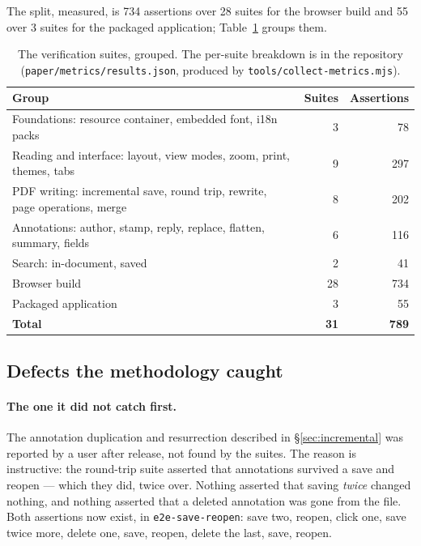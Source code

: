 The split, measured, is 734 assertions over 28 suites for the browser build and 55 over 3
suites for the packaged application; Table~\ref{tab:suites} groups them.

\begin{table}[t]
  \centering
  \caption{The verification suites, grouped. The per-suite breakdown is in the repository
  (\texttt{paper/\allowbreak metrics/\allowbreak results.json}, produced by \texttt{tools/\allowbreak collect-metrics.mjs}).}
  \label{tab:suites}
  \small
  \begin{tabular}{@{}lrr@{}}
    \toprule
    Group & Suites & Assertions \\
    \midrule
    Foundations: resource container, embedded font, i18n packs & 3 & 78 \\
    Reading and interface: layout, view modes, zoom, print, themes, tabs & 9 & 297 \\
    PDF writing: incremental save, round trip, rewrite, page operations, merge & 8 & 202 \\
    Annotations: author, stamp, reply, replace, flatten, summary, fields & 6 & 116 \\
    Search: in-document, saved & 2 & 41 \\
    \midrule
    Browser build & 28 & 734 \\
    Packaged application & 3 & 55 \\
    \midrule
    \textbf{Total} & \textbf{31} & \textbf{789} \\
    \bottomrule
  \end{tabular}
\end{table}

\subsection{Defects the methodology caught}

\paragraph{The one it did not catch first.} The annotation duplication and resurrection
described in \S\ref{sec:incremental} was reported by a user after release, not found by the
suites. The reason is instructive: the round-trip suite asserted that annotations survived a
save and reopen --- which they did, twice over. Nothing asserted that saving \emph{twice}
changed nothing, and nothing asserted that a deleted annotation was gone from the file. Both
assertions now exist, in \texttt{e2e-save-reopen}: save two, reopen, click one, save twice
more, delete one, save, reopen, delete the last, save, reopen.

